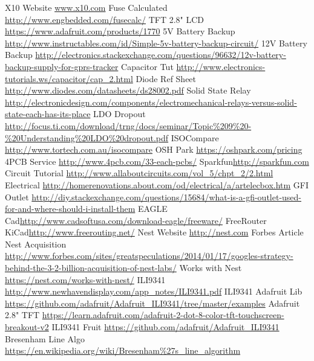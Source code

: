 \renewcommand{\refname}{}
\begin{thebibliography}{9}
 X10 Website \url{www.x10.com}
 Fuse Calculated \url{http://www.engbedded.com/fusecalc/}
 TFT 2.8" LCD \url{https://www.adafruit.com/products/1770}
 5V Battery Backup \url{http://www.instructables.com/id/Simple-5v-battery-backup-circuit/}
 12V Battery Backup \url{http://electronics.stackexchange.com/questions/96632/12v-battery-backup-supply-for-gprs-tracker}
 Capacitor Tut \url{http://www.electronics-tutorials.ws/capacitor/cap_2.html}
 Diode Ref Sheet \url{http://www.diodes.com/datasheets/ds28002.pdf}
 Solid State Relay \url{http://electronicdesign.com/components/electromechanical-relays-versus-solid-state-each-has-its-place}
 LDO Dropout \url{http://focus.ti.com/download/trng/docs/seminar/Topic\%209\%20-\%20Understanding\%20LDO\%20dropout.pdf}
 ISOCompare \url{http://www.tortech.com.au/isocompare}
 OSH Park \url{https://oshpark.com/pricing}
 4PCB Service \url{http://www.4pcb.com/33-each-pcbs/}
 Sparkfun\url{http://sparkfun.com}
 Circuit Tutorial \url{http://www.allaboutcircuits.com/vol_5/chpt_2/2.html}
 Electrical \url{http://homerenovations.about.com/od/electrical/a/artelecbox.htm}
 GFI Outlet \url{http://diy.stackexchange.com/questions/15684/what-is-a-gfi-outlet-used-for-and-where-should-i-install-them}
 EAGLE Cad\url{http://www.cadsoftusa.com/download-eagle/freeware/}
 FreeRouter KiCad\url{http://www.freerouting.net/}
 Nest Website \url{http://nest.com}
 Forbes Article Nest Acquisition \url{http://www.forbes.com/sites/greatspeculations/2014/01/17/googles-strategy-behind-the-3-2-billion-acquisition-of-nest-labs/}
 Works with Nest \url{https://nest.com/works-with-nest/}
 ILI9341 \url{http://www.newhavendisplay.com/app_notes/ILI9341.pdf}
 ILI9341 Adafruit Lib \url{https://github.com/adafruit/Adafruit_ILI9341/tree/master/examples}
 Adafruit 2.8" TFT \url{https://learn.adafruit.com/adafruit-2-dot-8-color-tft-touchscreen-breakout-v2}
 ILI9341 Fruit \url{https://github.com/adafruit/Adafruit_ILI9341}
 Bresenham Line Algo \url{https://en.wikipedia.org/wiki/Bresenham\%27s_line_algorithm}
\end{thebibliography}
